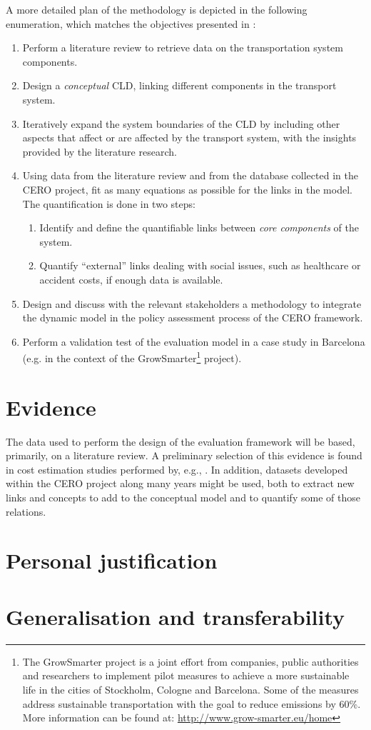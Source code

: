 A more detailed plan of the methodology is depicted in the following enumeration, which matches the objectives presented in :
%
\begin{enumerate}[label=(\alph*)]
	\item Perform a literature review to retrieve data on the transportation system components.
	\item Design a \textit{conceptual} CLD, linking different components in the transport system.
	\item Iteratively expand the system boundaries of the CLD by including other aspects that affect or are affected by the transport system, with the insights provided by the literature research.
	\item Using data from the literature review and from the database collected in the CERO project, fit as many equations as possible for the links in the model. The quantification is done in two steps:
	\begin{enumerate}[label=\roman*.]
		\item Identify and define the quantifiable links between \textit{core components} of the system.
		\item Quantify ``external'' links dealing with social issues, such as healthcare or accident costs, if enough data is available.
	\end{enumerate}
	\item Design and discuss with the relevant stakeholders a methodology to integrate the dynamic model in the policy assessment process of the CERO framework.
	\item Perform a validation test of the evaluation model in a case study in Barcelona (e.g. in the context of the GrowSmarter\footnote{The GrowSmarter project is a joint effort from companies, public authorities and researchers to implement pilot measures to achieve a more sustainable life in the cities of Stockholm, Cologne and Barcelona. Some of the measures address sustainable transportation with the goal to reduce  emissions by 60\%. More information can be found at: \url{http://www.grow-smarter.eu/home}} project).
\end{enumerate}

\section{Evidence}
\label{s:evidence}
The data used to perform the design of the evaluation framework will be based, primarily, on a literature review. A preliminary selection of this evidence is found in cost estimation studies performed by, e.g., \textcite{lizeng2012costcongestion,robert2006stockholm2030,trafikverket2016asek,mizutani2011estimatingcosts}. In addition, datasets developed within the CERO project along many years might be used, both to extract new links and concepts to add to the conceptual model and to quantify some of those relations.

\section{Personal justification}
\label{s:personal-justification}



\section{Generalisation and transferability}
\label{s:generalisation}
